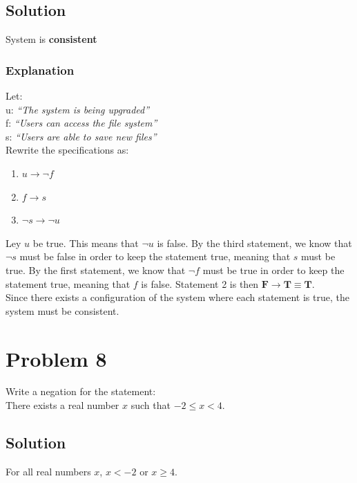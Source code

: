 \documentclass[table]{article}
\begin{document}
\subsection{Solution}
System is \textbf{consistent}
\subsubsection{Explanation}
Let:\\
\indent u: \emph{``The system is being upgraded''}\\
\indent f: \emph{``Users can access the file system''}\\
\indent s: \emph{``Users are able to save new files''}\\
Rewrite the specifications as:
\begin{enumerate}[nosep, label=\arabic*)]
\item $u \rightarrow \neg f$
\item $f \rightarrow s$
\item $\neg s \rightarrow \neg u$
\end{enumerate}
Ley $u$ be true. This means that $\neg u$ is false. By the third statement, we know that $\neg s$ must be false in order to keep the statement true, meaning that $s$ must be true. By the first statement, we know that $\neg f$ must be true in order to keep the statement true, meaning that $f$ is false. Statement 2 is then $\textbf{F} \rightarrow \textbf{T} \equiv \textbf{T}$.\\
Since there exists a configuration of the system where each statement is true, the system must be consistent.
\section{Problem 8}
Write a negation for the statement:\\
There exists a real number $x$ such that $-2 \leq x < 4$.
\subsection{Solution}
For all real numbers $x$, $x < -2$ or $x \geq 4$.
\end{document}
